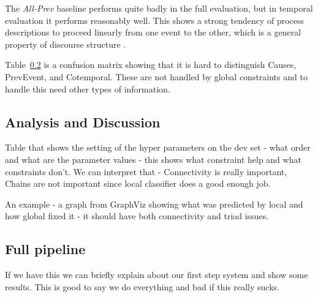 The \emph{All-Prev} baseline performs quite badly in the full evaluation, but in temporal evaluation it performs reasonably well. This shows a strong tendency of process descriptions to proceed linearly from one event to the other, which is a general property of discourse structure \cite{schegloff73}.


Table~\ref{} is a confusion matrix showing that it is hard to distinguish Causes, PrevEvent, and Cotemporal. These are not handled by global constraints and to handle this need other types of information.

\subsection{Analysis and Discussion}

Table that shows the setting of the hyper parameters on the dev set  - what order and what are the parameter values - this shows what constraint help and what constraints don't. We can interpret that - Connectivity is really important, Chains are not important since local classifier does a good enough job.

An example - a graph from GraphViz showing what was predicted by local and how global fixed it - it should have both connectivity and triad issues.

\subsection{Full pipeline}

If we have this we can briefly explain about our first step system and show some results. This is good to say we do everything and bad if this really sucks.

